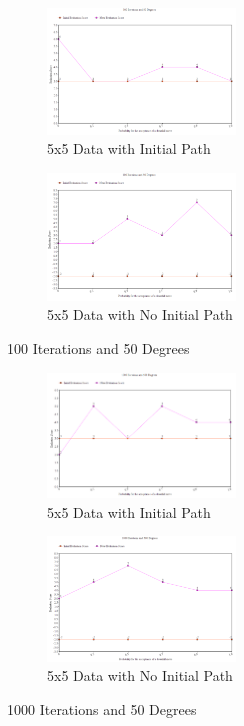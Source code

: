 \documentclass[11pt, oneside]{article}   	%
\begin{document}
\begin{figure}[H]
\centering
\begin{subfigure}{.5\textwidth}
	\centering
	\includegraphics[width=50mm]{5x5lowIlowT.png}
	\caption{5x5 Data with Initial Path}
	\label{fig:method}
\end{subfigure}%
\begin{subfigure}{.5\textwidth}
	\centering
	\includegraphics[width=50mm]{5x5lowIlowTPath.png}
	\caption{5x5 Data with No Initial Path}
	\label{fig:method}
\end{subfigure}
\caption{100 Iterations and 50 Degrees}
\end{figure}

\begin{figure}[H]
\centering
\begin{subfigure}{.5\textwidth}
	\centering
	\includegraphics[width=50mm]{5x5highIhighT.png}
	\caption{5x5 Data with Initial Path}
	\label{fig:method}
\end{subfigure}%
\begin{subfigure}{.5\textwidth}
	\centering
	\includegraphics[width=50mm]{5x5highIhighTPath.png}
	\caption{5x5 Data with No Initial Path}
	\label{fig:method}
\end{subfigure}
\caption{1000 Iterations and 50 Degrees}
\end{figure}
\end{document}

